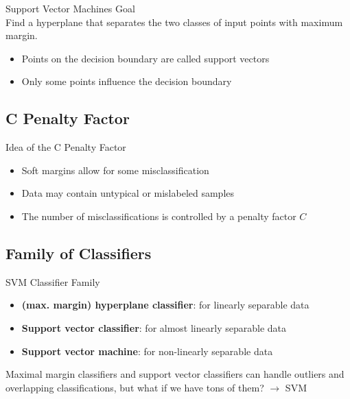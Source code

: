 \begin{definition}{Support Vector Machines Goal}\\
Find a hyperplane that separates the two classes of input points with maximum margin.
\begin{itemize}
    \item Points on the decision boundary are called support vectors
    \item Only some points influence the decision boundary
\end{itemize}
\end{definition}

\subsection{C Penalty Factor}

\begin{concept}{Idea of the C Penalty Factor}\\
\begin{itemize}
    \item Soft margins allow for some misclassification
    \item Data may contain untypical or mislabeled samples
    \item The number of misclassifications is controlled by a penalty factor $C$
\end{itemize}
\end{concept}


\subsection{Family of Classifiers}

\begin{concept}{SVM Classifier Family}
\begin{itemize}
    \item \textbf{(max. margin) hyperplane classifier}: for linearly separable data
    \item \textbf{Support vector classifier}: for almost linearly separable data
    \item \textbf{Support vector machine}: for non-linearly separable data
\end{itemize}
\end{concept}

\begin{remark}
Maximal margin classifiers and support vector classifiers can handle outliers and overlapping classifications, but what if we have tons of them? $\rightarrow$ SVM
\end{remark}

